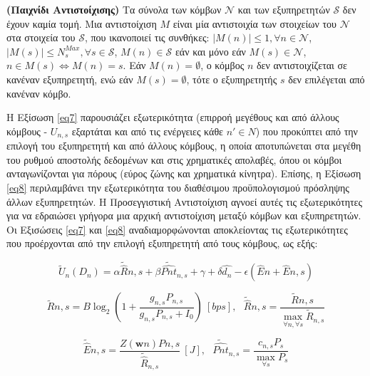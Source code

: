 \begin{definition} \label{Definition 1} \textbf{(Παιχνίδι Αντιστοίχισης)} Τα σύνολα των κόμβων $\mathcal{N}$ και των εξυπηρετητών $\mathcal{S}$ δεν έχουν καμία τομή. Μια αντιστοίχιση $M$ είναι μία αντιστοιχία των στοιχείων του $\mathcal{N}$ στα στοιχεία του $\mathcal{S}$, που ικανοποιεί τις συνθήκες: $|M(n)| \leq 1, \forall n \in \mathcal{N}$, $|M(s)| \leq N_s^{Max}, \forall s \in \mathcal{S}$, $M(n) \in \mathcal{S}$ εάν και μόνο εάν $M(s) \in \mathcal{N}$, $n \in M(s) \Leftrightarrow M(n) = s$. Εάν $M(n) = \emptyset$, ο κόμβος $n$ δεν αντιστοιχίζεται σε κανέναν εξυπηρετητή, ενώ εάν $M(s) = \emptyset$, τότε ο εξυπηρετητής $s$ δεν επιλέγεται από κανέναν κόμβο.

\end{definition}

Η Εξίσωση \ref{eq7} παρουσιάζει εξωτερικότητα (επιρροή μεγέθους και από άλλους κόμβους - $U_{n,s}$ εξαρτάται και από τις ενέργειες κάθε $n' \in N$) που προκύπτει από την επιλογή του εξυπηρετητή και από άλλους κόμβους, η οποία αποτυπώνεται στα μεγέθη του ρυθμού αποστολής δεδομένων και στις χρηματικές απολαβές, όπου οι κόμβοι ανταγωνίζονται για πόρους (εύρος ζώνης και χρηματικά κίνητρα). Επίσης, η Εξίσωση \ref{eq8} περιλαμβάνει την εξωτερικότητα του διαθέσιμου προϋπολογισμού πρόσληψης άλλων εξυπηρετητών. Η Προσεγγιστική Αντιστοίχιση αγνοεί αυτές τις εξωτερικότητες για να εδραιώσει γρήγορα μια αρχική αντιστοίχιση μεταξύ κόμβων και εξυπηρετητών. Οι Εξισώσεις \ref{eq7} και \ref{eq8} αναδιαμορφώνονται αποκλείοντας τις εξωτερικότητες που προέρχονται από την επιλογή εξυπηρετητή από τους κόμβους, ως εξής:

\vspace{-8pt}

\begin{equation}
\widetilde{U}_n(D_n)=\alpha \widetilde{\hat{R}}{n,s} + \beta \widetilde{\hat{Pnt}}_{n,s} +\gamma + \delta \hat{d_n} -\epsilon (\hat{E}n+\hat{E}{n,s})
\label{eq9}
\end{equation}

\vspace{-8pt}

\[\widetilde{R}{n,s} = B \log_2(1 + \frac{g_{n,s} P_{n,s}}{g_{n,s} P_{n,s} + I_0}) \> [bps], \>\>\> \widetilde{\hat{R}}{n,s} = \frac{\widetilde{R}{n,s}}{\max \limits_{\forall n, \forall s} { \widetilde{R}_{n,s} }}\]

\[\widetilde{\hat{E}}{n,s} = \frac{Z(\mathbf{w}n)P{n,s}}{\widetilde{\hat{R}}_{n,s}} \> [J], \>\>\> \widetilde{\hat{Pnt}}_{n,s} = \frac{c_{n,s}P_s}{\max \limits_{\forall s} P_s}\]

